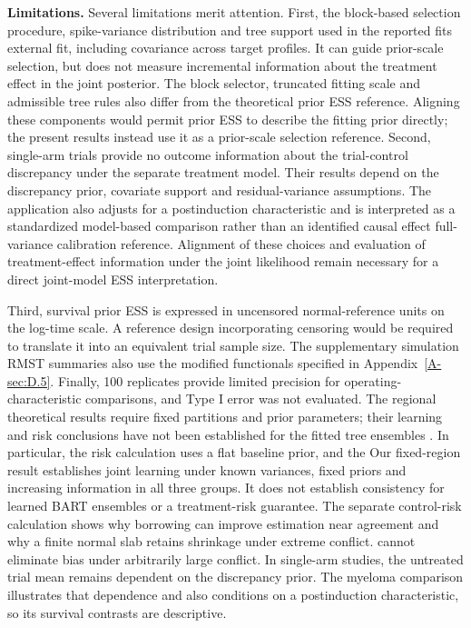 \documentclass[11pt]{article}
\theoremstyle{remark}\newtheorem{remark}{Remark}[section]
\providecommand{\DIFaddtex}[1]{{\protect\color{blue} \sf #1}} %
\providecommand{\DIFdeltex}[1]{{\protect\color{red} \scriptsize #1}} %
\providecommand{\DIFaddbegin}{} %
\providecommand{\DIFaddend}{} %
\providecommand{\DIFdelbegin}{} %
\providecommand{\DIFdelend}{} %
\providecommand{\DIFadd}[1]{\texorpdfstring{\DIFaddtex{#1}}{#1}} %
\providecommand{\DIFdel}[1]{\texorpdfstring{\DIFdeltex{#1}}{}} %
\begin{document}
\DIFdel{\textbf{Limitations.}
Several limitations merit attention. First, the block-based selection procedure, spike-variance distribution and tree support used in the reported fits }\DIFdelend \DIFaddbegin \DIFadd{external fit, including covariance across target profiles. It can guide prior-scale selection, but does not measure incremental information about the treatment effect in the joint posterior. The block selector, truncated fitting scale and admissible tree rules also }\DIFaddend differ from the \DIFdelbegin \DIFdel{theoretical prior ESS reference. Aligning these components would permit prior ESS to describe the fitting prior directly; the present results instead use it as a prior-scale selection reference. Second, single-arm trials provide no outcome information about the trial-control discrepancy under the separate treatment model. Their results depend on the discrepancy prior, covariate support and residual-variance assumptions. The application also adjusts for a postinduction characteristic and is interpreted as a standardized model-based comparison rather than an identified causal effect}\DIFdelend \DIFaddbegin \DIFadd{full-variance calibration reference. Alignment of these choices and evaluation of treatment-effect information under the joint likelihood remain necessary for a direct joint-model ESS interpretation}\DIFaddend .

\DIFdelbegin \DIFdel{Third, survival prior ESS is expressed in uncensored normal-reference units on the log-time scale. A reference design incorporating censoring would be required to translate it into an equivalent trial sample size. The supplementary simulation RMST summaries also use the modified functionals specified in Appendix~\ref{A-sec:D.5}. Finally, 100 replicates provide limited precision for operating-characteristic comparisons, and Type I error was not evaluated. The regional theoretical results require fixed partitions and prior parameters; their learning and risk conclusions have not been established for the fitted tree ensembles . In particular, the risk calculation uses a flat baseline prior, and the }\DIFdelend \DIFaddbegin \DIFadd{Our fixed-region result establishes joint learning under known variances, fixed priors and increasing information in all three groups. It does not establish consistency for learned BART ensembles or a treatment-risk guarantee. The separate control-risk calculation shows why borrowing can improve estimation near agreement and why a }\DIFaddend finite normal slab \DIFdelbegin \DIFdel{retains shrinkage under extreme conflict. }\DIFdelend \DIFaddbegin \DIFadd{cannot eliminate bias under arbitrarily large conflict. In single-arm studies, the untreated trial mean remains dependent on the discrepancy prior. The myeloma comparison illustrates that dependence and also conditions on a postinduction characteristic, so its survival contrasts are descriptive.
}\DIFaddend 
\end{document}
